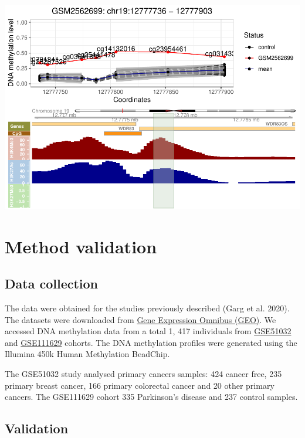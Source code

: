 \documentclass[
]{article}
\begin{document}
\includegraphics{sup_mat_files/figure-latex/plot_mvo_regulation-1.pdf}

\hypertarget{method-validation}{%
\section{Method validation}\label{method-validation}}

\hypertarget{data-collection}{%
\subsection{Data collection}\label{data-collection}}

The data were obtained for the studies previously described (Garg et al.
2020). The datasets were downloaded from
\href{https://www.ncbi.nlm.nih.gov/geo/}{Gene Expression Omnibus (GEO)}.
We accessed DNA methylation data from a total 1, 417 individuals from
\href{https://www.ncbi.nlm.nih.gov/geo/query/acc.cgi?acc=GSE51032}{GSE51032}
and \href{https://www.ncbi.nlm.nih.gov/geo/query/acc.cgi}{GSE111629}
cohorts. The DNA methylation profiles were generated using the Illumina
450k Human Methylation BeadChip.

The GSE51032 study analysed primary cancers samples: 424 cancer free,
235 primary breast cancer, 166 primary colorectal cancer and 20 other
primary cancers. The GSE111629 cohort 335 Parkinson's disease and 237
control samples.

\hypertarget{validation}{%
\subsection{Validation}\label{validation}}
\end{document}
